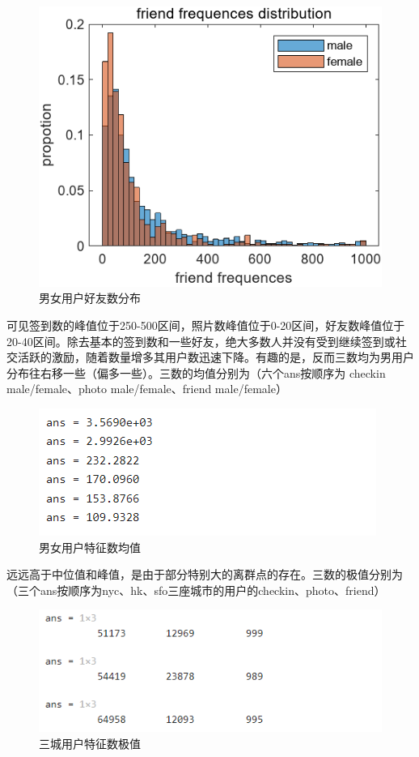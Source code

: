 \documentclass[UTF8]{ctexart}
\begin{document}
		\begin{figure}[H]
			\centering
			\includegraphics{friendDis_male&female.png}
			\caption{男女用户好友数分布}
			\label{fd_mf}
		\end{figure}
	
		可见签到数的峰值位于250-500区间，照片数峰值位于0-20区间，好友数峰值位于20-40区间。除去基本的签到数和一些好友，绝大多数人并没有受到继续签到或社交活跃的激励，随着数量增多其用户数迅速下降。有趣的是，反而三数均为男用户分布往右移一些（偏多一些）。三数的均值分别为（六个ans按顺序为 checkin male/female、photo male/female、friend male/female）
		
		\begin{figure}[H]
			\centering
			\includegraphics[scale=0.8]{cpf_mean.png}
			\caption{男女用户特征数均值}
			\label{cpf_mean}
		\end{figure}
		
		远远高于中位值和峰值，是由于部分特别大的离群点的存在。三数的极值分别为（三个ans按顺序为nyc、hk、sfo三座城市的用户的checkin、photo、friend）
		
		\begin{figure}[H]
			\centering
			\includegraphics[scale=0.7]{nhs_max.png}
			\caption{三城用户特征数极值}
			\label{nhs_max}
		\end{figure}
		
\end{document}
